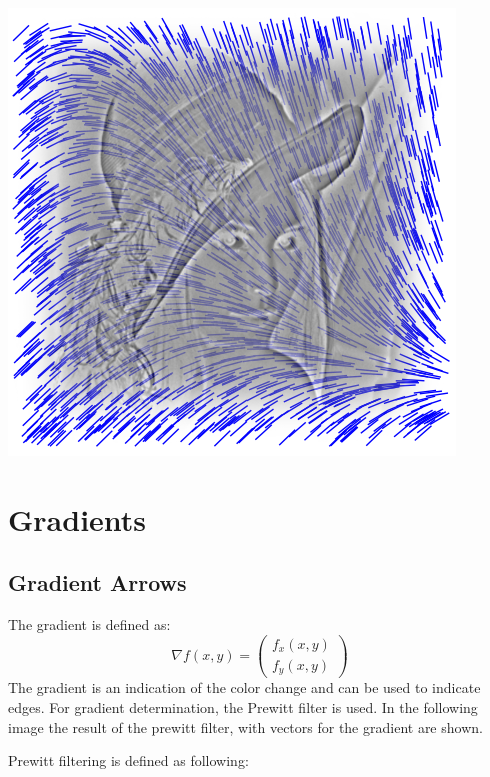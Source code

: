 \documentclass[a4paper,12px]{article}
\begin{document}
\vspace{2cm}
\begin{center}
    \includegraphics[width=(\textwidth/6*5)]{front}
\end{center}
\clearpage

\tableofcontents
\vspace{5mm}

\captionsetup{width=\textwidth/7*5}


\section{Gradients}
\subsection{Gradient Arrows}

The gradient is defined as:
$$\nabla f(x,y)=\!\!\left(\begin{array}{c} f_x(x,y) \\
f_y(x,y)\end{array}\right)$$
The gradient is an indication of the color change and can be used to indicate
edges. For gradient determination, the Prewitt filter is used. In the following
image the result of the prewitt filter, with vectors for the gradient are shown.

Prewitt filtering is defined as following:
\end{document}
